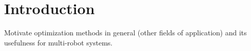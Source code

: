 
\section{Introduction}\label{sec:1}

Motivate optimization methods in general (other fields of application) and its usefulness for multi-robot systems.
